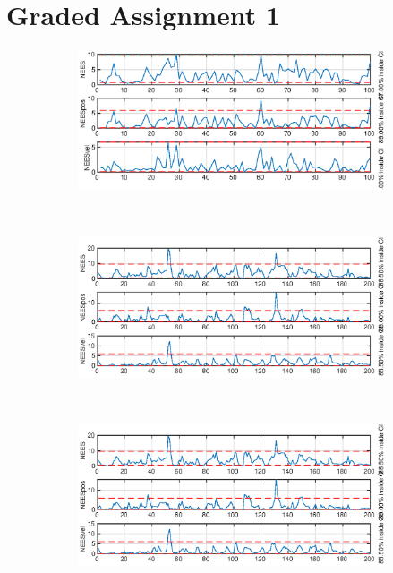 \section{Graded Assignment 1}\label{sec:graded_assignment_1}

\begin{figure}[ht]
	\begin{subfigure}[b]{0.4\textwidth}
		\includegraphics[width=\textwidth]{figures/ga_1/2_NEES}
		\caption{}
		\label{fig:ga_1_2_NEES}
	\end{subfigure}%
       ~
	\begin{subfigure}[b]{0.4\textwidth}
		\includegraphics[width=\textwidth]{figures/ga_1/joyride_NEES}
		\caption{}
		\label{fig:ga_1_joyride_NEES}
	\end{subfigure}
        \\
    \begin{subfigure}[b]{0.4\textwidth}
        \includegraphics[width=\textwidth]{figures/ga_1/2_estimated_trajectory}

\end{subfigure}
\end{figure}
